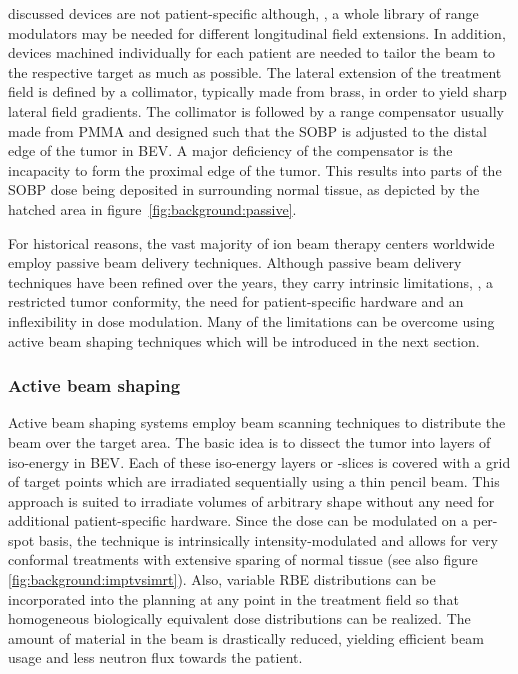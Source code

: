 discussed devices are not patient-specific although, \eg, a whole
library of range modulators may be needed for different longitudinal
field extensions. In addition, devices machined individually for each
patient are needed to tailor the beam to the respective target as much
as possible.  The lateral extension of the treatment field is defined
by a collimator, typically made from brass, in order to yield sharp
lateral field gradients.  The collimator is followed by a range
compensator usually made from \ac{PMMA} and designed such that the
\ac{SOBP} is adjusted to the distal edge of the tumor in \ac{BEV}. A
major deficiency of the compensator is the incapacity to form the
proximal edge of the tumor. This results into parts of the \ac{SOBP}
dose being deposited in surrounding normal tissue, as depicted by the
hatched area in figure~\ref{fig:background:passive}.

For historical reasons, the vast majority of ion beam therapy
centers worldwide employ passive beam delivery techniques.  Although
passive beam delivery techniques have been refined over the years,
they carry intrinsic limitations, \eg, a restricted tumor
conformity, the need for patient-specific hardware and an
inflexibility in dose modulation.  Many of the limitations can be
overcome using active beam shaping techniques which will be introduced
in the next section.


\subsubsection{Active beam shaping}
\label{sec:background:activedelivery}
Active beam shaping systems employ beam scanning techniques to
distribute the beam over the target area. The basic idea is to dissect
the tumor into layers of iso-energy in \acf{BEV}. Each of these
iso-energy layers or -slices is covered with a grid of target points
which are irradiated sequentially using a thin pencil beam. This
approach is suited to irradiate volumes of arbitrary shape without any
need for additional patient-specific hardware. Since the dose can be
modulated on a per-spot basis, the technique is intrinsically
intensity-modulated and allows for very conformal treatments with
extensive sparing of normal tissue (see also figure~
\vref{fig:background:imptvsimrt}).  Also, variable \ac{RBE}
distributions can be incorporated into the planning at any point in
the treatment field so that homogeneous biologically equivalent dose
distributions can be realized. The amount of material in the beam is
drastically reduced, yielding efficient beam usage and less neutron
flux towards the patient.

